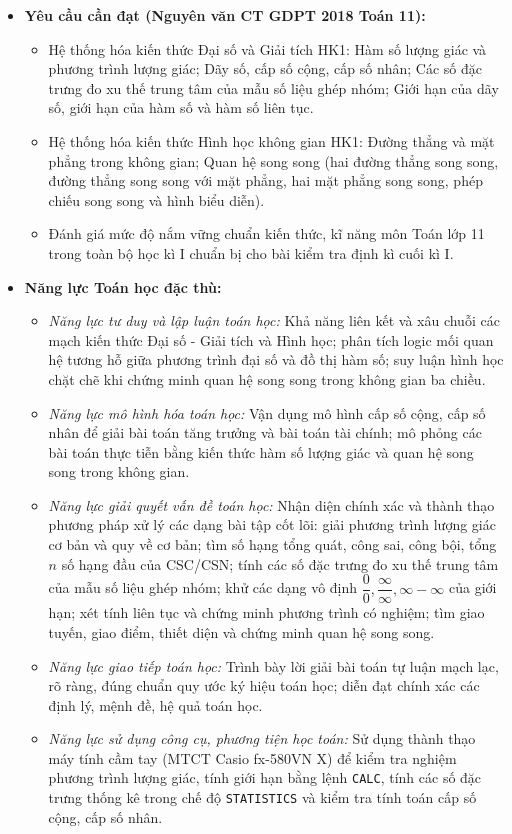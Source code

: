 \documentclass[12pt, a4paper]{article}
\begin{document}
\begin{itemize}[leftmargin=1.2cm]
    \item \textbf{Yêu cầu cần đạt (Nguyên văn CT GDPT 2018 Toán 11):}
    \begin{itemize}[leftmargin=0.6cm]
        \item Hệ thống hóa kiến thức Đại số và Giải tích HK1: Hàm số lượng giác và phương trình lượng giác; Dãy số, cấp số cộng, cấp số nhân; Các số đặc trưng đo xu thế trung tâm của mẫu số liệu ghép nhóm; Giới hạn của dãy số, giới hạn của hàm số và hàm số liên tục.
        \item Hệ thống hóa kiến thức Hình học không gian HK1: Đường thẳng và mặt phẳng trong không gian; Quan hệ song song (hai đường thẳng song song, đường thẳng song song với mặt phẳng, hai mặt phẳng song song, phép chiếu song song và hình biểu diễn).
        \item Đánh giá mức độ nắm vững chuẩn kiến thức, kĩ năng môn Toán lớp 11 trong toàn bộ học kì I chuẩn bị cho bài kiểm tra định kì cuối kì I.
    \end{itemize}

    \item \textbf{Năng lực Toán học đặc thù:}
    \begin{itemize}[leftmargin=0.6cm]
        \item \textit{Năng lực tư duy và lập luận toán học:} Khả năng liên kết và xâu chuỗi các mạch kiến thức Đại số - Giải tích và Hình học; phân tích logic mối quan hệ tương hỗ giữa phương trình đại số và đồ thị hàm số; suy luận hình học chặt chẽ khi chứng minh quan hệ song song trong không gian ba chiều.
        \item \textit{Năng lực mô hình hóa toán học:} Vận dụng mô hình cấp số cộng, cấp số nhân để giải bài toán tăng trưởng và bài toán tài chính; mô phỏng các bài toán thực tiễn bằng kiến thức hàm số lượng giác và quan hệ song song trong không gian.
        \item \textit{Năng lực giải quyết vấn đề toán học:} Nhận diện chính xác và thành thạo phương pháp xử lý các dạng bài tập cốt lõi: giải phương trình lượng giác cơ bản và quy về cơ bản; tìm số hạng tổng quát, công sai, công bội, tổng $n$ số hạng đầu của CSC/CSN; tính các số đặc trưng đo xu thế trung tâm của mẫu số liệu ghép nhóm; khử các dạng vô định $\dfrac{0}{0}, \dfrac{\infty}{\infty}, \infty - \infty$ của giới hạn; xét tính liên tục và chứng minh phương trình có nghiệm; tìm giao tuyến, giao điểm, thiết diện và chứng minh quan hệ song song.
        \item \textit{Năng lực giao tiếp toán học:} Trình bày lời giải bài toán tự luận mạch lạc, rõ ràng, đúng chuẩn quy ước ký hiệu toán học; diễn đạt chính xác các định lý, mệnh đề, hệ quả toán học.
        \item \textit{Năng lực sử dụng công cụ, phương tiện học toán:} Sử dụng thành thạo máy tính cầm tay (MTCT Casio fx-580VN X) để kiểm tra nghiệm phương trình lượng giác, tính giới hạn bằng lệnh \texttt{CALC}, tính các số đặc trưng thống kê trong chế độ \texttt{STATISTICS} và kiểm tra tính toán cấp số cộng, cấp số nhân.
    \end{itemize}


\end{itemize}
\end{document}
